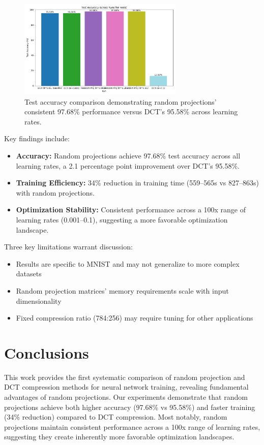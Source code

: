 \documentclass{article} %
\begin{document}
\begin{figure}[h]
    \centering
    \includegraphics[width=0.7\textwidth]{test_accuracy_mnist_across_runs.png}
    \caption{Test accuracy comparison demonstrating random projections' consistent 97.68\% performance versus DCT's 95.58\% across learning rates.}
    \label{fig:accuracy}
\end{figure}

Key findings include:

\begin{itemize}
    \item \textbf{Accuracy:} Random projections achieve 97.68\% test accuracy across all learning rates, a 2.1 percentage point improvement over DCT's 95.58\%.
    \item \textbf{Training Efficiency:} 34\% reduction in training time (559--565s vs 827--863s) with random projections.
    \item \textbf{Optimization Stability:} Consistent performance across a 100x range of learning rates (0.001--0.1), suggesting a more favorable optimization landscape.
\end{itemize}

Three key limitations warrant discussion:
\begin{itemize}
    \item Results are specific to MNIST and may not generalize to more complex datasets
    \item Random projection matrices' memory requirements scale with input dimensionality
    \item Fixed compression ratio (784:256) may require tuning for other applications
\end{itemize}

\section{Conclusions}
\label{sec:conclusion}

This work provides the first systematic comparison of random projection and DCT compression methods for neural network training, revealing fundamental advantages of random projections. Our experiments demonstrate that random projections achieve both higher accuracy (97.68\% vs 95.58\%) and faster training (34\% reduction) compared to DCT compression. Most notably, random projections maintain consistent performance across a 100x range of learning rates, suggesting they create inherently more favorable optimization landscapes.
\end{document}
